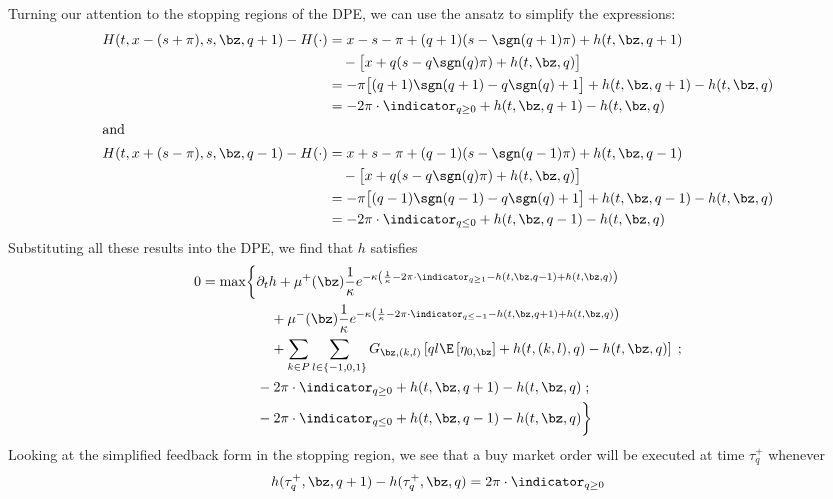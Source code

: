 \documentclass[12pt]{article}
\begin{document}
Turning our attention to the stopping regions of the DPE, we can use the ansatz to simplify the expressions:
\begin{align*}
H(t,x-(s+\pi), s, \bz, q+1) - H(\cdot) & = x - s - \pi + (q+1)(s - \sgn(q+1)\pi) + h(t, \bz, q+1) \\
& \quad - \bigl[ x + q(s - q\sgn(q)\pi) + h(t,\bz,q) \bigr] \\
& = -\pi \bigl[ (q+1)\sgn(q+1) - q\sgn(q) + 1 \bigr] + h(t, \bz, q+1) - h(t,\bz,q)  \\
& = - 2 \pi \cdot \indicator_{q \geq 0} + h(t, \bz, q+1) - h(t,\bz,q) \\
\intertext{and}
H(t,x+(s-\pi), s, \bz, q-1) - H(\cdot) & = x + s - \pi + (q-1)(s - \sgn(q-1)\pi) + h(t, \bz, q-1)\\
& \quad - \bigl[ x + q(s - q\sgn(q)\pi) + h(t,\bz,q) \bigr] \\
& = - \pi \bigl[ (q-1)\sgn(q-1) - q\sgn(q) + 1 \bigr] + h(t, \bz, q-1) - h(t,\bz,q)  \\
& = -2 \pi \cdot \indicator_{q \leq 0} + h(t, \bz, q-1) - h(t,\bz,q) \\ 
\end{align*}
Substituting all these results into the DPE, we find that $h$ satisfies
\begin{equation}\label{eq:PDEcase1}
\begin{split}
0 = \max \biggl\lbrace & \partial_t h + \mu^+(\bz) \frac{1}{\kappa} e^{ -\kappa \left( \frac{1}{\kappa} - 2 \pi \cdot \indicator_{q \geq 1} - h(t,\bz,q-1) + h(t,\bz,q)  \right)} \\
& \quad + \mu^-(\bz) \frac{1}{\kappa} e^{ -\kappa \left( \frac{1}{\kappa} - 2 \pi \cdot \indicator_{q \leq -1} - h(t,\bz,q+1) + h(t,\bz,q) \right)} \\
& \quad + \sum_{k\in P} \sum_{l \in \{-1,0,1\}} G_{\bz,(k,l)} \left[ ql \E \left[ \eta_{0,\bz} \right] + h(t,(k,l),q) - h(t,\bz,q) \right] \; ; \\
& -2 \pi \cdot \indicator_{q \geq 0} + h(t, \bz, q+1) - h(t,\bz,q)   \; ; \\
& -2 \pi \cdot \indicator_{q \leq 0} + h(t, \bz, q-1) - h(t,\bz,q)  \biggr\rbrace
\end{split}
\end{equation}
Looking at the simplified feedback form in the stopping region, we see that a buy market order will be executed at time $\tau^+_q$ whenever
\begin{equation}
\label{eq:buyMOfeedback}
h(\tau^+_q, \bz, q+1) - h(\tau^+_q,\bz,q) = 2 \pi \cdot \indicator_{q \geq 0}
\end{equation}
\end{document}

